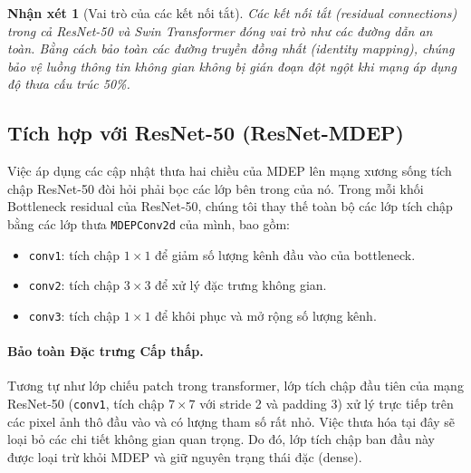 \documentclass[11pt, a4paper]{article}
\newtheorem{remark}{Nhận xét}
\begin{document}
\begin{remark}[Vai trò của các kết nối tắt]
Các kết nối tắt (residual connections) trong cả ResNet-50 và Swin Transformer đóng vai trò như các đường dẫn an toàn. Bằng cách bảo toàn các đường truyền đồng nhất (identity mapping), chúng bảo vệ luồng thông tin không gian không bị gián đoạn đột ngột khi mạng áp dụng độ thưa cấu trúc 50\%.
\end{remark}

\subsection{Tích hợp với ResNet-50 (ResNet-MDEP)}\label{subsec:resnet}

Việc áp dụng các cập nhật thưa hai chiều của MDEP lên mạng xương sống tích chập ResNet-50 đòi hỏi phải bọc các lớp bên trong của nó. Trong mỗi khối Bottleneck residual của ResNet-50, chúng tôi thay thế toàn bộ các lớp tích chập bằng các lớp thưa \texttt{MDEPConv2d} của mình, bao gồm:
\begin{itemize}
    \item \texttt{conv1}: tích chập $1 \times 1$ để giảm số lượng kênh đầu vào của bottleneck.
    \item \texttt{conv2}: tích chập $3 \times 3$ để xử lý đặc trưng không gian.
    \item \texttt{conv3}: tích chập $1 \times 1$ để khôi phục và mở rộng số lượng kênh.
\end{itemize}

\paragraph{Bảo toàn Đặc trưng Cấp thấp.}
Tương tự như lớp chiếu patch trong transformer, lớp tích chập đầu tiên của mạng ResNet-50 (\texttt{conv1}, tích chập $7 \times 7$ với stride 2 và padding 3) xử lý trực tiếp trên các pixel ảnh thô đầu vào và có lượng tham số rất nhỏ. Việc thưa hóa tại đây sẽ loại bỏ các chi tiết không gian quan trọng. Do đó, lớp tích chập ban đầu này được loại trừ khỏi MDEP và giữ nguyên trạng thái đặc (dense).
\end{document}
